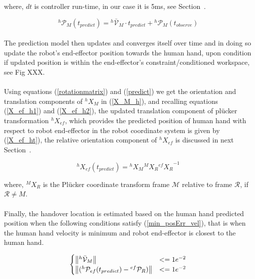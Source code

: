 \documentclass[a4paper, 12pt, oneside]{Thesis}  %
\begin{document}
where, $dt$ is controller run-time, in our case it is 5ms, see Section~.

\begin{equation} \label{predict}
{}^{h}\mathcal{P}_M(t_{predict}) = {}^{h}\mathcal{\bar{V}}_{M} \cdot t_{predict}  + {}^{h}\mathcal{P}_{M}(t_{observe})
\end{equation}

\paragraph*{}
The prediction model then updates and converges itself over time and in doing so update the robot's end-effector position towards the human hand, upon condition if updated position is within the end-effector's constraint/conditioned workspace, see Fig XXX.

\paragraph*{}
Using equations (\ref{rotationmatrix}) and (\ref{predict}) we get the orientation and translation components of ${}^{h}{X}_M$ in (\ref{X_M_h}), and recalling equations (\ref{X_ef_h1}) and (\ref{X_ef_h2}), the updated translation component of pl\"ucker transformation ${}^{h}{X}_{ef}$, which provides the predicted position of human hand with respect to robot end-effector in the robot coordinate system is given by (\ref{X_ef_ht}), the relative orientation component of ${}^{h}{X}_{ef}$ is discussed in next Section~.

\begin{equation}\label{X_ef_ht}
{}^{h}{X}_{ef}(t_{predict}) =  {}^{h}{X}_M  {}^{M}{X}_R {{}^{ef}{X}_R}^{-1}
\end{equation}

where, ${}^{M}{X}_R$ is the Pl\"ucker coordinate transform frame $\mathcal{M}$ relative to frame $\mathcal{R}$, if $\mathcal R \neq M$.

\paragraph*{}
Finally, the handover location is estimated based on the human hand predicted position when the following conditions satisfy (\ref{min_posErr_vel}), that is when the human hand velocity is minimum and robot end-effector is closest to the human hand.

\begin{equation}\label{min_posErr_vel}
\begin{cases}
	\norm{{}^{h}\mathcal{\bar{V}}_{M}}& <= 1e^{-2} \\
	\norm{({}^{h}\mathcal{P}_{ef}(t_{predict}) - {}^{ef}\mathcal{P}_{R})} & <= 1e^{-2}
\end{cases}
\end{equation}
\end{document}
